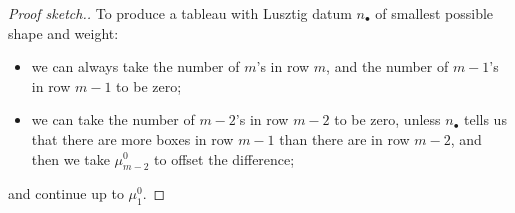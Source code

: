 \documentclass[draft]{article} %
\begin{document}
\begin{proof}[Proof sketch.]
To produce a tableau with Lusztig datum $n_\bullet$ of smallest possible shape and weight:
    \begin{itemize}
        \item we can always take the number of $m$'s in row $m$, and the number of $m-1$'s in row $m-1$ to be zero; 
        \item we can take the number of $m-2$'s in row $m-2$ to be zero, unless $n_\bullet$ tells us 
        that there are more boxes in row $m-1$ than there are in row $m-2$, and then we take $\mu^0_{m-2}$ to offset the difference; 
    \end{itemize}
    and continue up to $\mu^0_1$. 
\end{proof}
% 
\end{document}

